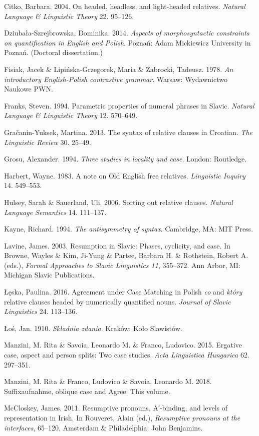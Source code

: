 \documentclass[output=paper]{langsci/langscibook}
\begin{document}
Citko, Barbara. 2004. On headed, headless, and light-headed relatives. \textit{Natural Language \& Linguistic Theory} 22. 95–126.

Dziubała-Szrejbrowska, Dominika. 2014. \textit{Aspects of morphosyntactic constraints on quantification in English and Polish}. Poznań: Adam Mickiewicz University in Poznań. (Doctoral dissertation.)

Fisiak, Jacek \& Lipińska-Grzegorek, Maria \& Zabrocki, Tadeusz. 1978. \textit{An introductory English-Polish contrastive grammar}. Warsaw: Wydawnictwo Naukowe PWN.

Franks, Steven. 1994. Parametric properties of numeral phrases in Slavic. \textit{Natural Language \& Linguistic Theory} 12. 570–649.

Gračanin-Yuksek, Martina. 2013. The syntax of relative clauses in Croatian. \textit{The Linguistic Review} 30. 25–49.

Grosu, Alexander. 1994. \textit{Three studies in locality and case}. London: Routledge.

Harbert, Wayne. 1983. A note on Old English free relatives. \textit{Linguistic Inquiry} 14. 549–553.

Hulsey, Sarah \& Sauerland, Uli. 2006. Sorting out relative clauses. \textit{Natural} \textit{Language Semantics} 14. 111–137.

Kayne, Richard. 1994. \textit{The antisymmetry of syntax}. Cambridge, MA: MIT Press.

Lavine, James. 2003. Resumption in Slavic: Phases, cyclicity, and case. In Browne, Wayles \& Kim, Ji-Yung \& Partee, Barbara H. \& Rothstein, Robert A. (eds.), \textit{Formal Approaches to Slavic Linguistics 11}, 355–372. Ann Arbor, MI: Michigan Slavic Publications.

Łęska, Paulina. 2016. Agreement under Case Matching in Polish \textit{co} and \textit{który} relative clauses headed by numerically quantified nouns. \textit{Journal of Slavic Linguistics} 24. 113–136.

Łoś, Jan. 1910. \textit{Składnia zdania}. Kraków: Koło Slawistów.

Manzini, M. Rita \& Savoia, Leonardo M. \& Franco, Ludovico. 2015. Ergative case, aspect and person splits: Two case studies. \textit{Acta Linguistica Hungarica} 62. 297–351.

Manzini, M. Rita \& Franco, Ludovico \& Savoia, Leonardo M. 2018. Suffixaufnahme, oblique case and Agree. This volume.

McCloskey, James. 2011. Resumptive pronouns, A′-binding, and levels of representation in Irish. In Rouveret, Alain (ed.), \textit{Resumptive pronouns at the interfaces}, 65–120. Amsterdam \& Philadelphia: John Benjamins.
\end{document}
